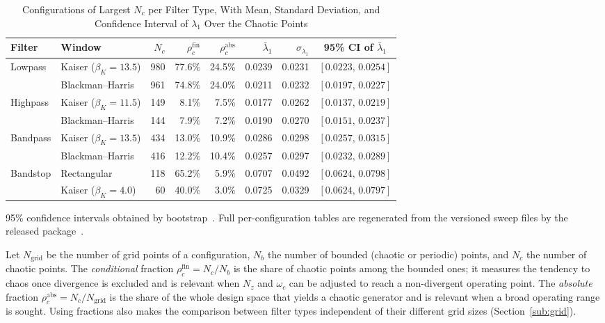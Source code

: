 \documentclass[journal]{IEEEtran}
\begin{document}
\begin{table}[!t]
\caption{Configurations of Largest $N_c$ per Filter Type, With Mean, Standard Deviation, and Confidence Interval of $\lambda_1$ Over the Chaotic Points\label{tab:best}}
\centering
\begin{tabular}{llrrrrrc}
\toprule
\textbf{Filter} & \textbf{Window} & $N_c$ &
$\rho_c^{\text{fin}}$ & $\rho_c^{\text{abs}}$ &
$\bar\lambda_1$ & $\sigma_{\lambda_1}$ & 95\% CI of $\bar\lambda_1$ \\
\midrule
Lowpass   & Kaiser ($\beta_K{=}13.5$) & 980 & 77.6\% & 24.5\% & 0.0239 & 0.0231 & $[0.0223,\,0.0254]$ \\
          & Blackman--Harris          & 961 & 74.8\% & 24.0\% & 0.0211 & 0.0232 & $[0.0197,\,0.0227]$ \\
\midrule
Highpass  & Kaiser ($\beta_K{=}11.5$) & 149 & 8.1\% & 7.5\% & 0.0177 & 0.0262 & $[0.0137,\,0.0219]$ \\
          & Blackman--Harris          & 144 & 7.9\% & 7.2\% & 0.0190 & 0.0270 & $[0.0151,\,0.0237]$ \\
\midrule
Bandpass  & Kaiser ($\beta_K{=}13.5$) & 434 & 13.0\% & 10.9\% & 0.0286 & 0.0298 & $[0.0257,\,0.0315]$ \\
          & Blackman--Harris          & 416 & 12.2\% & 10.4\% & 0.0257 & 0.0297 & $[0.0232,\,0.0289]$ \\
\midrule
Bandstop  & Rectangular               & 118 & 65.2\% & 5.9\% & 0.0707 & 0.0492 & $[0.0624,\,0.0798]$ \\
          & Kaiser ($\beta_K{=}4.0$)  & 60 & 40.0\% & 3.0\% & 0.0725 & 0.0329 & $[0.0624,\,0.0797]$ \\
\bottomrule
\end{tabular}

\vspace{2pt}
{\footnotesize 95\% confidence intervals obtained by
bootstrap~\cite{EfronTibshirani1993}. Full per-configuration tables are
regenerated from the versioned sweep files by the released
package~\cite{chaoticPFC2026}.}
\end{table}

Let $N_{\text{grid}}$ be the number of grid points of a configuration, $N_b$
the number of bounded (chaotic or periodic) points, and $N_c$ the number of
chaotic points. The \emph{conditional} fraction
$\rho_c^{\text{fin}}=N_c/N_b$ is the share of chaotic points among the bounded
ones; it measures the tendency to chaos once divergence is excluded and is
relevant when $N_z$ and $\omega_c$ can be adjusted to reach a non-divergent
operating point. The \emph{absolute} fraction
$\rho_c^{\text{abs}}=N_c/N_{\text{grid}}$ is the share of the whole design
space that yields a chaotic generator and is relevant when a broad operating
range is sought. Using fractions also makes the comparison between filter
types independent of their different grid sizes (Section~\ref{sub:grid}).
\end{document}
